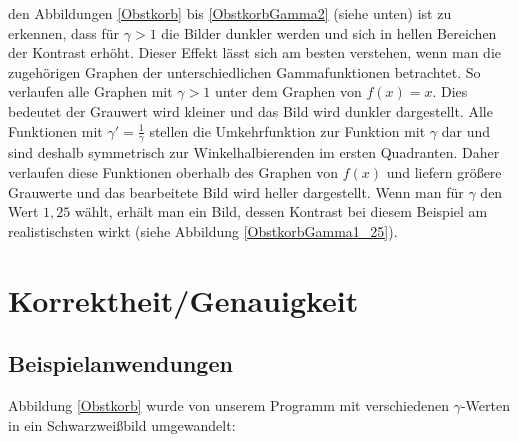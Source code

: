 \documentclass[course=erap]{aspdoc}
\begin{document}
	\noindentAn den Abbildungen \ref{Obstkorb} bis \ref{ObstkorbGamma2} (siehe unten) ist zu erkennen, dass für $\gamma > 1$ die Bilder dunkler werden und sich in hellen Bereichen der Kontrast erhöht. Dieser Effekt lässt sich am besten verstehen, wenn man die zugehörigen Graphen der unterschiedlichen Gammafunktionen betrachtet. So verlaufen alle Graphen mit $\gamma > 1$  unter dem Graphen von $f(x)=x$. Dies bedeutet der Grauwert wird kleiner und das Bild wird dunkler dargestellt. Alle Funktionen mit $\gamma ' = \frac{1}{\gamma}$ stellen die Umkehrfunktion zur Funktion mit $\gamma$ dar und sind deshalb symmetrisch zur Winkelhalbierenden im ersten Quadranten. Daher verlaufen diese Funktionen oberhalb des Graphen von $f(x)$ und liefern größere Grauwerte und das bearbeitete Bild wird heller dargestellt. Wenn man für $\gamma$ den Wert $1,25$ wählt, erhält man ein Bild, dessen Kontrast bei diesem Beispiel am realistischsten wirkt (siehe Abbildung \ref{ObstkorbGamma1_25}).\\  
	
	\section{Korrektheit/Genauigkeit}
	 
	\subsection{Beispielanwendungen}
	Abbildung \ref{Obstkorb} wurde von unserem Programm mit verschiedenen $\gamma$-Werten in ein Schwarzweißbild umgewandelt:
	
\end{document}
